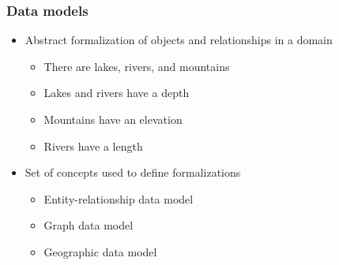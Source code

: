 \documentclass{beamer}
\begin{document}
\begin{frame}
  \frametitle{Data models}
  
  \begin{itemize}
  \item Abstract formalization of objects and relationships in a domain
  \begin{itemize}
    \item There are lakes, rivers, and mountains
    \item Lakes and rivers have a depth
    \item Mountains have an elevation
    \item Rivers have a length
  \end{itemize}
  \item Set of concepts used to define formalizations
  \begin{itemize}
    \item Entity-relationship data model
    \item Graph data model
    \item Geographic data model
  \end{itemize}
  \end{itemize}
\end{frame}
\end{document}
